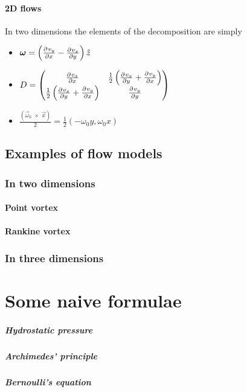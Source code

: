 \subsubsection{2D flows}
In two dimensions the elements of the decomposition are simply
\begin{itemize}
\item $\boldsymbol{\mathrm{\omega}} = \left( \frac{\partial{^{}}v_y}{\partial{{x}^{}}}  -  \frac{\partial{^{}}v_x}{\partial{{y}^{}}} \right)\hat{z}$
\item $D = \begin{pmatrix}
 \frac{\partial{^{}}v_x}{\partial{{x}^{}}}  & \frac{1}{2}\left( \frac{\partial{^{}}v_x}{\partial{{y}^{}}}  +  \frac{\partial{^{}}v_y}{\partial{{x}^{}}} \right) \\
\frac{1}{2}\left( \frac{\partial{^{}}v_x}{\partial{{y}^{}}}  +  \frac{\partial{^{}}v_y}{\partial{{x}^{}}} \right) &  \frac{\partial{^{}}v_y}{\partial{{y}^{}}} 
\end{pmatrix}$
\item $\frac{(\vec{\omega}_0\; \times \; \vec{x})}{2} = \frac{1}{2}(-\omega_0 y, \omega_0 x)$
\end{itemize}

\section{Examples of flow models}
\subsection{In two dimensions}
\subsubsection{Point vortex}
\subsubsection{Rankine vortex}
\subsection{In three dimensions}

\chapter{Some naive formulae}
\paragraph{Hydrostatic pressure}
\paragraph{Archimedes' principle}
\paragraph{Bernoulli's equation}

